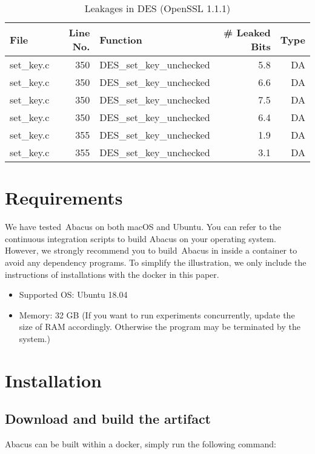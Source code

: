 \documentclass[10pt,conference]{IEEEtran}
\newcommand{\tool}{\textsf{Abacus}}
\begin{document}
\begin{table}[h!]
\centering\tiny\scriptsize
\caption{Leakages in DES (OpenSSL 1.1.1)}\label{tab:DESOpenSSL1.1.1}
\begin{tabular}{lrlrr}
\hline
\textbf{File} & \textbf{Line No.} & \textbf{Function} & \textbf{\# Leaked Bits} & \textbf{Type} \\\hline
set\_key.c& 350&DES\_set\_key\_unchecked&5.8 &DA\\
set\_key.c& 350&DES\_set\_key\_unchecked&6.6 &DA\\
set\_key.c& 350&DES\_set\_key\_unchecked&7.5 &DA\\
set\_key.c& 350&DES\_set\_key\_unchecked&6.4 &DA\\
set\_key.c& 355&DES\_set\_key\_unchecked&1.9 &DA\\
set\_key.c& 355&DES\_set\_key\_unchecked&3.1 &DA\\
\hline
\end{tabular}
\renewcommand{\baselinestretch}{1.0}\selectfont
\end{table}

\section{Requirements}
We have tested~\tool{} on both macOS and Ubuntu. You can refer to the continuous integration scripts to build Abacus on your operating system. However, we strongly recommend you to build~\tool{} in inside a container to avoid any dependency programs. To simplify the illustration, we only include the instructions of installations with the docker in this paper.
\begin{itemize}
\item Supported OS: Ubuntu 18.04
\item Memory: 32 GB (If you want to run experiments concurrently, update the size of RAM
     accordingly. Otherwise the program may be terminated by the system.)
\end{itemize}

\section{Installation}

\subsection{Download and build the artifact}
\tool{} can be built within a docker, simply run the following command:
\end{document}
